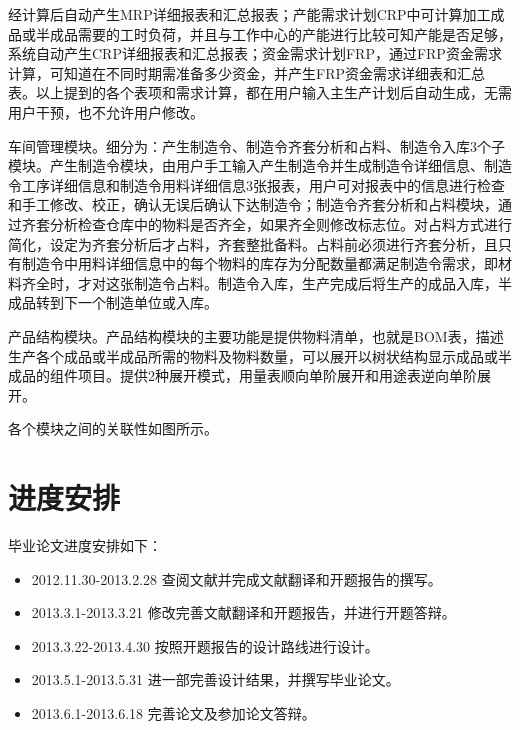 \documentclass{Proposal}
\begin{document}
经计算后自动产生MRP详细报表和汇总报表；产能需求计划CRP中可计算加工成品或半成品需要的工时负荷，并且与工作中心的产能进行比较可知产能是否足够，系统自动产生CRP详细报表和汇总报表；资金需求计划FRP，通过FRP资金需求计算，可知道在不同时期需准备多少资金，并产生FRP资金需求详细表和汇总表。以上提到的各个表项和需求计算，都在用户输入主生产计划后自动生成，无需用户干预，也不允许用户修改。

车间管理模块。细分为：产生制造令、制造令齐套分析和占料、制造令入库3个子模块。产生制造令模块，由用户手工输入产生制造令并生成制造令详细信息、制造令工序详细信息和制造令用料详细信息3张报表，用户可对报表中的信息进行检查和手工修改、校正，确认无误后确认下达制造令；制造令齐套分析和占料模块，通过齐套分析检查仓库中的物料是否齐全，如果齐全则修改标志位。对占料方式进行简化，设定为齐套分析后才占料，齐套整批备料。占料前必须进行齐套分析，且只有制造令中用料详细信息中的每个物料的库存为分配数量都满足制造令需求，即材料齐全时，才对这张制造令占料。制造令入库，生产完成后将生产的成品入库，半成品转到下一个制造单位或入库。

产品结构模块。产品结构模块的主要功能是提供物料清单，也就是BOM表，描述生产各个成品或半成品所需的物料及物料数量，可以展开以树状结构显示成品或半成品的组件项目。提供2种展开模式，用量表顺向单阶展开和用途表逆向单阶展开。

各个模块之间的关联性如图所示。


\section{进度安排}

毕业论文进度安排如下：
\begin{itemize}
\item 2012.11.30-2013.2.28 查阅文献并完成文献翻译和开题报告的撰写。
\item 2013.3.1-2013.3.21 修改完善文献翻译和开题报告，并进行开题答辩。
\item 2013.3.22-2013.4.30 按照开题报告的设计路线进行设计。
\item 2013.5.1-2013.5.31 进一部完善设计结果，并撰写毕业论文。
\item 2013.6.1-2013.6.18 完善论文及参加论文答辩。
\end{itemize}
\end{document}
